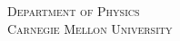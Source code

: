 
\noindent %
\begin{minipage}{.40\textwidth}
	\small\textsc{Department of Physics}\\%
	\small\textsc{Carnegie Mellon University}
\end{minipage}%
\hfill	
\begin{minipage}{0.60\textwidth}%
	\raggedleft%
	{\Large \textsc{\doctitle}\par}
	\doublerule 
\end{minipage}%
\vspace{0.9cm}
{
	\centering
	\vspace{.2cm}
	\customhrule{0.5pt}
	{\scshape 
		\Large \coursenumber { } \coursetitle { }
		 \\
		\small\textsc{\semester}\par}
	\vspace{.3cm}
}